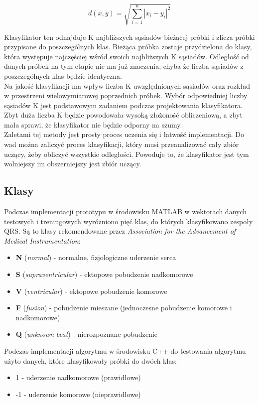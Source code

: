 \documentclass[[10pt,a4paper]{article}
\begin{document}
\[ d(x,y) = \sqrt{\displaystyle\sum_{i=1}^{n} |x_{i} - y_{i}|^{2}} \]

Klasyfikator ten odnajduje K najbliższych sąsiadów bieżącej próbki i zlicza próbki przypisane do poszczególnych klas. Bieżąca próbka zostaje przydzielona do klasy, która występuje najczęściej wśród swoich najbliższych K sąsiadów. Odległość od danych próbek na tym etapie nie ma już znaczenia, chyba że liczba sąsiadów z poszczególnych klas będzie identyczna. \\

Na jakość klasyfikacji ma wpływ liczba K uwzględnionych sąsiadów oraz rozkład w przestrzeni wielowymiarowej poprzednich próbek. Wybór odpowiedniej liczby sąsiadów K jest podstawowym zadaniem podczas projektowania klasyfikatora. Zbyt duża liczba K będzie powodowała wysoką złożoność obliczeniową, a zbyt mała sprawi, że klasyfikator nie będzie odporny na szumy. \\

Zaletami tej metody jest prosty proces uczenia się i łatwość implementacji. Do wad można zaliczyć  proces klasyfikacji, który musi przeanalizować cały zbiór uczący, żeby obliczyć wszystkie odległości. Powoduje to, że klasyfikator jest tym wolniejszy im obszerniejszy jest zbiór uczący.


\subsection{Klasy}
Podczas implementacji prototypu w środowisku MATLAB w wektorach danych testowych i treningowych wyróżniono pięć klas, do których klasyfikowano zespoły QRS. Są to klasy  rekomendowane przez \emph{Association for the Advancement of Medical Instrumentation}: 
\begin{itemize}
\item \textbf{N} (\emph{normal}) - normalne, fizjologiczne uderzenie serca
\item \textbf{S} (\emph{supraventricular}) - ektopowe pobudzenie nadkomorowe
\item \textbf{V} (\emph{ventricular}) - ektopowe pobudzenie komorowe
\item \textbf{F} (\emph{fusion}) - pobudzenie mieszane (jednoczesne pobudzenie komorowe i nadkomorowe)
\item \textbf{Q} (\emph{unknown beat}) - nierozpoznane pobudzenie
\end{itemize}

Podczas implementacji algorytmu w środowisku C++ do testowania algorytmu użyto danych, które klasyfikowały próbki do dwóch klas: \begin{itemize}
\item 1 - uderzenie nadkomorowe (prawidłowe)
\item -1 - uderzenie komorowe (nieprawidłowe)
\end{itemize}
\end{document}
